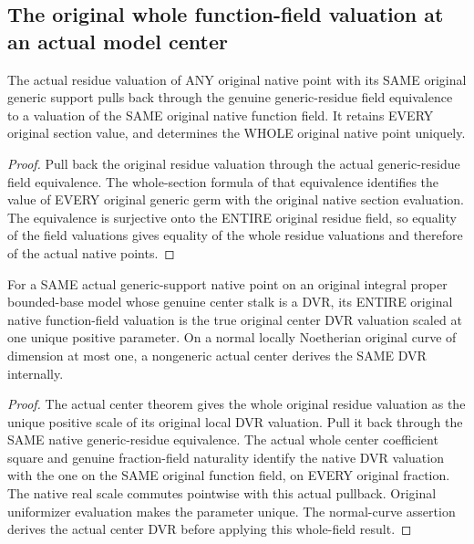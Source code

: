 \subsection{The original whole function-field valuation at an actual model center}

\begin{lemma}
\label{lem:actual-generic-native-field-valuations}
\leanok
The actual residue valuation of ANY original native point with its SAME
original generic support pulls back through the genuine generic-residue
field equivalence to a valuation of the SAME original native function field.
It retains EVERY original section value, and determines the WHOLE original
native point uniquely.
\end{lemma}
\begin{proof}
Pull back the original residue valuation through the actual generic-residue
field equivalence. The whole-section formula of that equivalence identifies
the value of EVERY original generic germ with the original native section
evaluation. The equivalence is surjective onto the ENTIRE original residue
field, so equality of the field valuations gives equality of the whole
residue valuations and therefore of the actual native points.
\end{proof}

\begin{lemma}
\label{lem:actual-generic-center-native-field-scale}
\leanok
For a SAME actual generic-support native point on an original integral proper
bounded-base model whose genuine center stalk is a DVR, its ENTIRE original
native function-field valuation is the true original center DVR valuation
scaled at one unique positive parameter. On a normal locally Noetherian
original curve of dimension at most one, a nongeneric actual center derives
the SAME DVR internally.
\end{lemma}
\begin{proof}
The actual center theorem gives the whole original residue valuation as the
unique positive scale of its original local DVR valuation. Pull it back
through the SAME native generic-residue equivalence. The actual whole center
coefficient square and genuine fraction-field naturality identify the native
DVR valuation with the one on the SAME original function field, on EVERY
original fraction. The native real scale commutes pointwise with this actual
pullback. Original uniformizer evaluation makes the parameter unique. The
normal-curve assertion derives the actual center DVR before applying this
whole-field result.
\end{proof}

